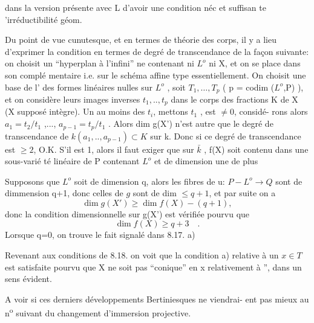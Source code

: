 
dans la version présente  avec L d'avoir une condition néc et suffisan%
te 'irréductibilité géom. 

Du point de vue cunutesque,  et en termes de théorie des
corps, il y a lieu d'exprimer la condition  en termes de
degré de transcendance de la façon suivante: on choisit un ``hyperplan
à l'infini'' ne contenant ni $L^{o}$ ni X, et on se place dans son complé%
mentaire i.e. sur le schéma affine  type essentiellement. On choisit
une base de l' des formes linéaires nulles sur $L^{o}$ , 
 soit $T_{1},\ldots,T_{p}$ ( p = codim ($L^{o}$,P) ), et on considère
leurs images inverses $t_{1},..,t_{p}$ dans le corps des fractions K de X
(X supposé intègre). Un au moins des $t_{i}$, mettons $t_{1}$ , est $\neq 0$, considé-%
rons alors $a_{1} = t_{2}/t_{1}$ ,..., $a_{p-1} = t_{p}/t_{1}$ . Alors dim g(X') n'est
autre que le degré de transcendance de $k(a_{1},..,a_{p-1}) \subset K$ sur k. Donc
si ce degré de transcendance est $\geqslant 2$, O.K.  S'il est 1,
alors il faut exiger que sur $\bar{k}$ , f(X) soit contenu dans une sous-varié%
té linéaire de P contenant $L^{o}$ et de dimension une de plus

Supposons que $L^{o}$ soit de dimension q, alors les fibres de u:
$P - L^{o} \to Q$ sont de dimmension q+1, donc celles de $g$ sont de dim $\leq q+1$, et par suite on a
\[ \dim g(X') \geqslant \dim f(X) - (q+1) , \]
donc la condition dimensionnelle sur g(X') est vérifiée pourvu que
\[ \dim f(X) \geqslant q+3 \quad . \]
Lorsque q=0, on trouve le fait signalé dans 8.17. a)\unsure{,}  

Revenant aux conditions de 8.18. on voit que la condition a)
relative à un $x \in T$ est satisfaite pourvu que X ne soit pas ``conique''
en x relativement à '', dans un sens évident.

\placedmargin{|} A voir si ces derniers développements Bertiniesques ne viendrai-%
ent pas mieux au n\textsuperscript{o} suivant du changement d'immersion projective. 
